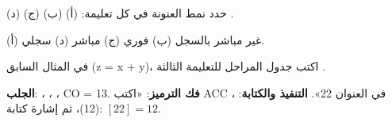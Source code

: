 \begin{tamrin}
    حدد نمط العنونة في كل تعليمة: (أ)  (ب)  (ج)  (د) .
\end{tamrin}
\begin{hall}
    (أ) غير مباشر بالسجل \quad (ب) فوري \quad (ج) مباشر \quad (د) سجلي.
\end{hall}

\begin{tamrin}
    في المثال السابق (\textenglish{z = x + y})، اكتب جدول المراحل للتعليمة الثالثة .
\end{tamrin}
\begin{hall}
    \textbf{الجلب}: ، ، ، \textenglish{CO = 13}.
    \textbf{فك الترميز}: «اكتب \textenglish{ACC} في العنوان 22».
    \textbf{التنفيذ والكتابة}: ،  (12)، ثم إشارة كتابة: $[22] = 12$.
\end{hall}
